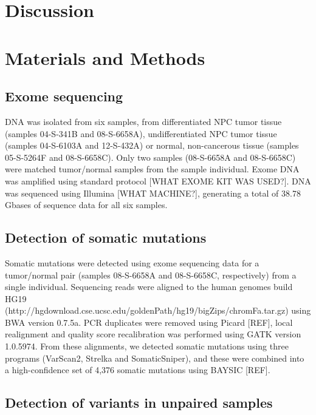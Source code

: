 \documentclass[10pt]{article}
\begin{document}
\section*{Discussion}

\section*{Materials and Methods}

\subsection*{Exome sequencing}

DNA was isolated from six samples, from differentiated NPC tumor tissue (samples 04-S-341B and 08-S-6658A), undifferentiated NPC tumor tissue (samples 04-S-6103A and 12-S-432A) or normal, non-cancerous tissue (samples 05-S-5264F and 08-S-6658C). Only two samples (08-S-6658A and 08-S-6658C) were matched tumor/normal samples from the sample individual. Exome DNA was amplified using standard protocol [WHAT EXOME KIT WAS USED?]. DNA was sequenced using Illumina [WHAT MACHINE?], generating 
a total of 38.78 Gbases of sequence data for all six samples. 

\subsection*{Detection of somatic mutations}
Somatic mutations were detected using exome sequencing data for a tumor/normal pair (samples 08-S-6658A and 08-S-6658C, respectively) from a single individual. Sequencing reads were aligned to the human genomes build HG19 (http://hgdownload.cse.ucsc.edu/goldenPath/hg19/bigZips/chromFa.tar.gz) using BWA version 0.7.5a. 
PCR duplicates were removed using Picard [REF], local realignment and quality score recalibration was performed using GATK version 1.0.5974. From these alignments, we detected somatic mutations using three programs (VarScan2, Strelka and SomaticSniper), and these were combined into a high-confidence set of 4,376 somatic mutations using BAYSIC [REF]. 

\subsection*{Detection of variants in unpaired samples}
\end{document}
